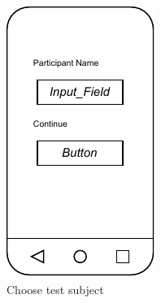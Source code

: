 \begin{figure}
    \begin{subfigure}[b]{0.25\textwidth}
        \centering
        \includegraphics[width=\textwidth]{content/05_design_and_dev_artefacts/ActivityParticipantChoose.drawio.pdf}
        \caption{Choose test subject}
        \label{subfig:chooseTestSubject}
    \end{subfigure}
    \hspace{1cm}
    \begin{subfigure}[b]{0.25\textwidth}

\end{subfigure}
\end{figure}
